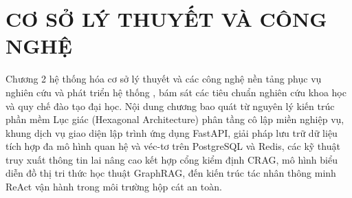 \chapter{CƠ SỞ LÝ THUYẾT VÀ CÔNG NGHỆ}
\label{ch:co_so_ly_thuyet}

Chương 2 hệ thống hóa cơ sở lý thuyết và các công nghệ nền tảng phục vụ nghiên cứu và phát triển hệ thống \VS, bám sát các tiêu chuẩn nghiên cứu khoa học và quy chế đào tạo đại học. Nội dung chương bao quát từ nguyên lý kiến trúc phần mềm Lục giác (Hexagonal Architecture) phân tầng cô lập miền nghiệp vụ, khung dịch vụ giao diện lập trình ứng dụng FastAPI, giải pháp lưu trữ dữ liệu tích hợp đa mô hình quan hệ và véc-tơ trên PostgreSQL và Redis, các kỹ thuật truy xuất thông tin lai nâng cao kết hợp cổng kiểm định CRAG, mô hình biểu diễn đồ thị tri thức học thuật GraphRAG, đến kiến trúc tác nhân thông minh ReAct vận hành trong môi trường hộp cát an toàn.






